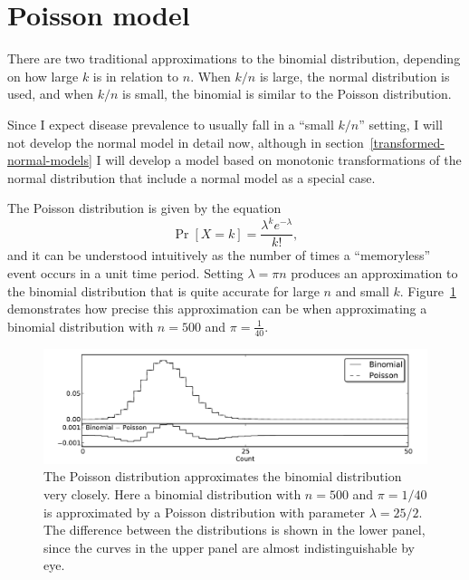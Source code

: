\section{Poisson model}
There are two traditional approximations to the binomial distribution,
depending on how large $k$ is in relation to $n$.  When $k/n$ is
large, the normal distribution is used, and when $k/n$ is small, the
binomial is similar to the Poisson distribution.

Since I expect disease prevalence to usually fall in a ``small $k/n$''
setting, I will not develop the normal model in detail now, although
in section~\ref{transformed-normal-models} I will develop a model based on monotonic
transformations of the normal distribution that include a normal
model as a special case.

The Poisson distribution is given by the equation
\[
\Pr[X=k] =
\frac{\lambda^k e^{-\lambda}}{k!},
\]
and it can be understood intuitively as the number of times a
``memoryless'' event occurs in a unit time period.  Setting $\lambda
=\pi n$ produces an approximation to the binomial distribution that
is quite accurate for large $n$ and small
$k$. Figure~\ref{rate-model-poisson-approx-to-binom} demonstrates how
precise this approximation can be when approximating a binomial
distribution with $n=500$ and $\pi=\frac{1}{40}$.

\begin{figure}[h]
\begin{center}
\includegraphics[width=\textwidth]{poisson_approx_to_binom.pdf}
\end{center}
\caption[The Poisson distribution approximates the binomial distribution 
  very closely.]{The Poisson distribution approximates the binomial
  distribution very closely. Here a binomial distribution with $n=500$
  and $\pi=1/40$ is approximated by a Poisson distribution
  with parameter $\lambda=25/2$.  The difference between the
  distributions is shown in the lower panel, since the curves in the
  upper panel are almost indistinguishable by eye.}
\label{rate-model-poisson-approx-to-binom}
\end{figure}

